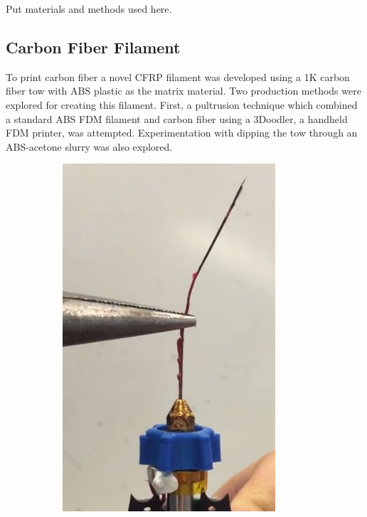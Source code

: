 

Put materials and methods used here.

\subsection*{Carbon Fiber Filament}

To print carbon fiber a novel CFRP filament was developed using a 1K carbon fiber tow with ABS plastic as the matrix material. Two production methods were explored for creating this filament. First, a pultrusion technique which combined a standard ABS FDM filament and carbon fiber using a 3Doodler, a handheld FDM printer, was attempted. Experimentation with dipping the tow through an ABS-acetone slurry was also explored.

\begin{figure}[t]
        \centering
        \begin{subfigure}[b]{0.4\linewidth}
                \includegraphics[width=\linewidth]{./figures/pultrusion-vid}

\end{subfigure}
\end{figure}
